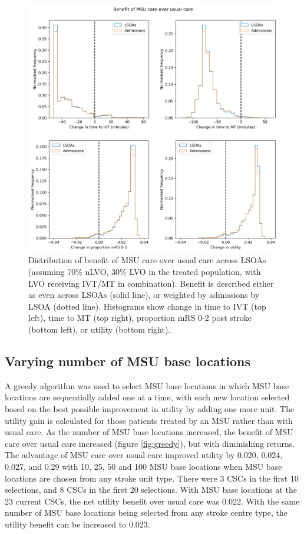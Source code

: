 \begin{figure}[h]
    \centering
    \includegraphics[width=0.75\linewidth]{images/histograms.png}
    \caption{Distribution of benefit of MSU care over usual care across LSOAs (assuming 70\% nLVO, 30\% LVO in the treated population, with LVO receiving IVT/MT in combination). Benefit is described either as even across LSOAs (solid line), or weighted by admissions by LSOA (dotted line). Histograms show change in time to IVT (top left), time to MT (top right), proportion mRS 0-2 post stroke (bottom left), or utility (bottom right).}
    \label{fig:msu_histograms}
\end{figure}

\subsection{Varying number of MSU base locations}

A greedy algorithm was used to select MSU base locations in which MSU base locations are sequentially added one at a time, with each new location selected based on the best possible improvement in utility by adding one more unit. The utility gain is calculated for those patients treated by an MSU rather than with usual care. As the number of MSU base locations increased, the benefit of MSU care over usual care increased (figure \ref{fig:greedy}), but with diminishing returns. The advantage of MSU care over usual care improved utility by 0.020, 0.024, 0.027, and 0.29 with 10, 25, 50 and 100 MSU base locations when MSU base locations are chosen from any stroke unit type. There were 3 CSCs in the first 10 selections, and 8 CSCs in the first 20 selections. With MSU base locations at the 23 current CSCs, the net utility benefit over usual care was 0.022. With the same number of MSU base locations being selected from any stroke centre type, the utility benefit can be increased to 0.023.

